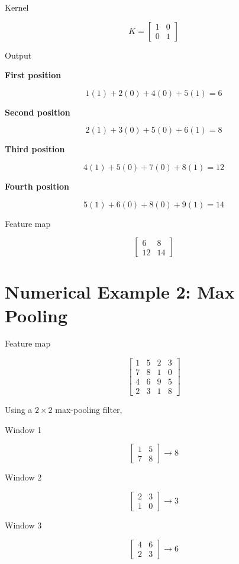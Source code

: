 \documentclass[12pt,a4paper]{article}
\begin{document}
Kernel

\[
K=
\begin{bmatrix}
1&0\\
0&1
\end{bmatrix}
\]

Output

\textbf{First position}

\[
1(1)+2(0)+4(0)+5(1)=6
\]

\textbf{Second position}

\[
2(1)+3(0)+5(0)+6(1)=8
\]

\textbf{Third position}

\[
4(1)+5(0)+7(0)+8(1)=12
\]

\textbf{Fourth position}

\[
5(1)+6(0)+8(0)+9(1)=14
\]

Feature map

\[
\begin{bmatrix}
6&8\\
12&14
\end{bmatrix}
\]

\section{Numerical Example 2: Max Pooling}

Feature map

\[
\begin{bmatrix}
1 & 5 & 2 & 3\\
7 & 8 & 1 & 0\\
4 & 6 & 9 & 5\\
2 & 3 & 1 & 8
\end{bmatrix}
\]

Using a \(2 \times 2\) max-pooling filter,

Window 1

\[
\begin{bmatrix}
1 & 5\\
7 & 8
\end{bmatrix}
\rightarrow 8
\]

Window 2

\[
\begin{bmatrix}
2 & 3\\
1 & 0
\end{bmatrix}
\rightarrow 3
\]

Window 3

\[
\begin{bmatrix}
4 & 6\\
2 & 3
\end{bmatrix}
\rightarrow 6
\]
\end{document}

